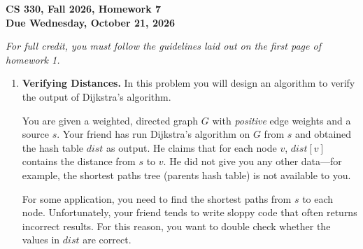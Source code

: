 \documentclass[11pt]{article}
\begin{document}
	
\begin{center}
\Large{\textbf{CS 330, Fall 2026, Homework 7 \\
Due Wednesday, October 21, 2026 \\
}}
\end{center}

\emph{For full credit, you must follow the guidelines laid out on the first page of homework 1.}\\

\begin{enumerate}
    \item \textbf{Verifying Distances.} In this problem you will design an algorithm to verify the output of Dijkstra's algorithm.

    You are given a weighted, directed graph $G$ with \emph{positive} edge weights and a source $s$. Your friend has run Dijkstra's algorithm on $G$ from $s$ and obtained the hash table $dist$ as output. He claims that for each node $v$, $dist[v]$ contains the  distance from $s$ to $v$. He did not give you any other data---for example, the shortest paths tree (parents hash table) is not available to you. 
    
    For some application, you need to find the shortest paths from $s$ to each node.  Unfortunately, your friend tends to write sloppy code that often returns incorrect results.
    For this reason, you want to double check whether the values in $dist$ are correct.


\end{enumerate}
\end{document}
